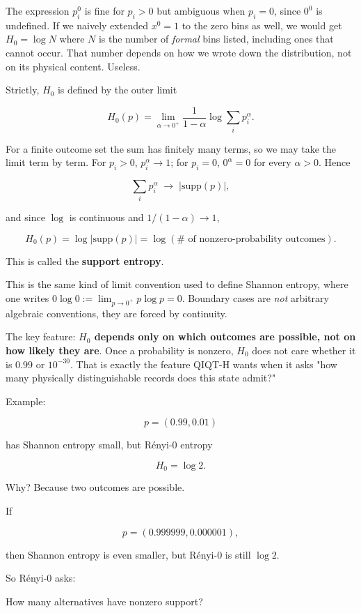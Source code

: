 \documentclass[11pt,a4paper]{article}
\newenvironment{qiqtquote}{\begin{mdframed}[style=quotestyle]}{\end{mdframed}}
\begin{document}
The expression $p_i^0$ is fine for $p_i > 0$ but ambiguous when $p_i = 0$, since $0^0$ is undefined. If we naively extended $x^0 = 1$ to the zero bins as well, we would get $H_0 = \log N$ where $N$ is the number of \emph{formal} bins listed, including ones that cannot occur. That number depends on how we wrote down the distribution, not on its physical content. Useless.

Strictly, $H_0$ is defined by the outer limit

\[
H_0(p) = \lim_{\alpha \to 0^+} \frac{1}{1-\alpha}\log\sum_i p_i^\alpha.
\]

For a finite outcome set the sum has finitely many terms, so we may take the limit term by term. For $p_i > 0$, $p_i^\alpha \to 1$; for $p_i = 0$, $0^\alpha = 0$ for every $\alpha > 0$. Hence

\[
\sum_i p_i^\alpha \;\longrightarrow\; |\mathrm{supp}(p)|,
\]

and since $\log$ is continuous and $1/(1-\alpha) \to 1$,

\[
H_0(p) = \log|\mathrm{supp}(p)| = \log(\#\text{ of nonzero-probability outcomes}).
\]

This is called the \textbf{support entropy}.

This is the same kind of limit convention used to define Shannon entropy, where one writes $0\log 0 := \lim_{p \to 0^+} p\log p = 0$. Boundary cases are \emph{not} arbitrary algebraic conventions, they are forced by continuity.

The key feature: \textbf{$H_0$ depends only on which outcomes are possible, not on how likely they are}. Once a probability is nonzero, $H_0$ does not care whether it is $0.99$ or $10^{-30}$. That is exactly the feature QIQT-H wants when it asks "how many physically distinguishable records does this state admit?"

Example:

\[
p=(0.99,0.01)
\]

has Shannon entropy small, but Rényi-0 entropy

\[
H_0 = \log 2.
\]

Why? Because two outcomes are possible.

If

\[
p=(0.999999,0.000001),
\]

then Shannon entropy is even smaller, but Rényi-0 is still $\log 2$.

So Rényi-0 asks:

\begin{qiqtquote}
How many alternatives have nonzero support?
\end{qiqtquote}
\end{document}
